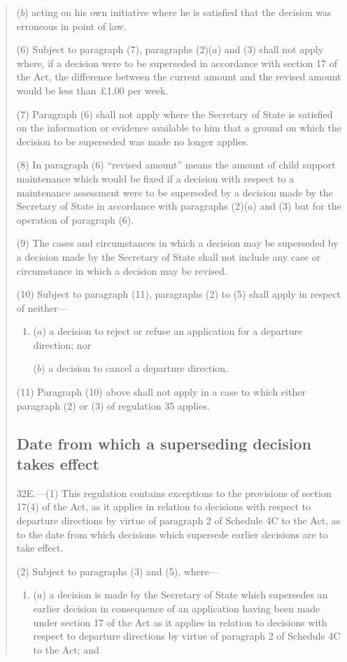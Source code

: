 \documentclass[12pt,a4paper]{article}
\begin{document}
\begin{quotation}
\begin{enumerate}
($b$) acting on his own initiative where he is satisfied that the decision was erroneous in point of law.
\end{enumerate}

(6) Subject to paragraph (7), paragraphs (2)($a$) and (3) shall not apply where, if a decision were to be superseded in accordance with section 17 of the Act, the difference between the current amount and the revised amount would be less than £1.00 per week.

(7) Paragraph (6) shall not apply where the Secretary of State is satisfied on the information or evidence available to him that a ground on which the decision to be superseded was made no longer applies.

(8) In paragraph (6) “revised amount” means the amount of child support maintenance which would be fixed if a decision with respect to a maintenance assessment were to be superseded by a decision made by the Secretary of State in accordance with paragraphs (2)($a$) and (3) but for the operation of paragraph (6).

(9) The cases and circumstances in which a decision may be superseded by a decision made by the Secretary of State shall not include any case or circumstance in which a decision may be revised.

(10) Subject to paragraph (11), paragraphs (2) to (5) shall apply in respect of neither---
\begin{enumerate}\item[]
($a$) a decision to reject or refuse an application for a departure direction; nor

($b$) a decision to cancel a departure direction.
\end{enumerate}

(11) Paragraph (10) above shall not apply in a case to which either paragraph (2) or (3) of regulation 35 applies.

\subsection*{Date from which a superseding decision takes effect}

32E.—(1) This regulation contains exceptions to the provisions of section 17(4) of the Act, as it applies in relation to decisions with respect to departure directions by virtue of paragraph 2 of Schedule 4C to the Act, as to the date from which decisions which supersede earlier decisions are to take effect.

(2) Subject to paragraphs (3) and (5), where---
\begin{enumerate}\item[]
($a$) a decision is made by the Secretary of State which supersedes an earlier decision in consequence of an application having been made under section 17 of the Act as it applies in relation to decisions with respect to departure directions by virtue of paragraph 2 of Schedule 4C to the Act; and


\end{enumerate}
\end{quotation}
\end{document}
